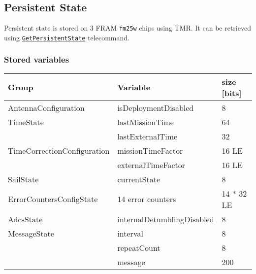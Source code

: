 \subsection{Persistent State}
\label{sec:ref-PersistentState}

Persistent state is stored on 3 FRAM \texttt{fm25w} chips using TMR. 
It can be retrieved using \hyperref[sec:tc-GetPersistentState]{\texttt{GetPersistentState}} telecommand.

\subsubsection{Stored variables}

\begin{tabular}{l | l | l}
Group                       & Variable                      & size [bits] \\
\hline
AntennaConfiguration        & isDeploymentDisabled          & 8 \\
TimeState                   & lastMissionTime               & 64 \\
                            & lastExternalTime              & 32 \\
TimeCorrectionConfiguration & missionTimeFactor             & 16 LE \\
                            & externalTimeFactor            & 16 LE \\
SailState                   & currentState                  & 8 \\
ErrorCountersConfigState    & 14 error counters             & 14 * 32 LE \\
AdcsState                   & internalDetumblingDisabled    & 8 \\
MessageState                & interval                      & 8 \\
                            & repeatCount                   & 8 \\
                            & message                       & 200 \\
\end{tabular}